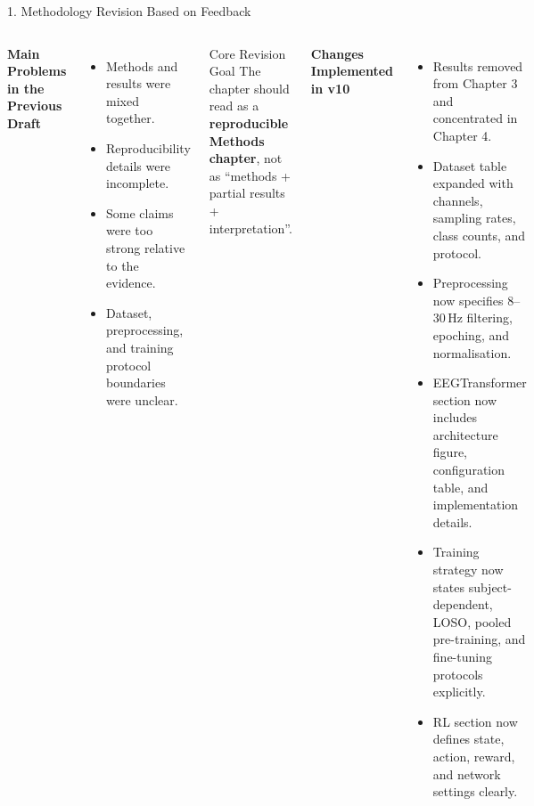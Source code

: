 \documentclass[aspectratio=169, 11pt]{beamer}
\begin{document}
\begin{frame}[shrink=7]{1. Methodology Revision Based on Feedback}

    \begin{columns}[T]
        \textbf{Main Problems in the Previous Draft}
        \begin{itemize}
            \item Methods and results were mixed together.
            \item Reproducibility details were incomplete.
            \item Some claims were too strong relative to the evidence.
            \item Dataset, preprocessing, and training protocol boundaries were unclear.
        \end{itemize}

        \vspace{1mm}
        \begin{exampleblock}{Core Revision Goal}
            The chapter should read as a \textbf{reproducible Methods chapter}, not as ``methods + partial results + interpretation''.
        \end{exampleblock}

        \textbf{Changes Implemented in v10}
        \begin{itemize}
            \item Results removed from Chapter 3 and concentrated in Chapter 4.
            \item Dataset table expanded with channels, sampling rates, class counts, and protocol.
            \item Preprocessing now specifies 8--30\,Hz filtering, epoching, and normalisation.
            \item EEGTransformer section now includes architecture figure, configuration table, and implementation details.
            \item Training strategy now states subject-dependent, LOSO, pooled pre-training, and fine-tuning protocols explicitly.
            \item RL section now defines state, action, reward, and network settings clearly.
        \end{itemize}
    \end{columns}
\end{frame}
\end{document}
